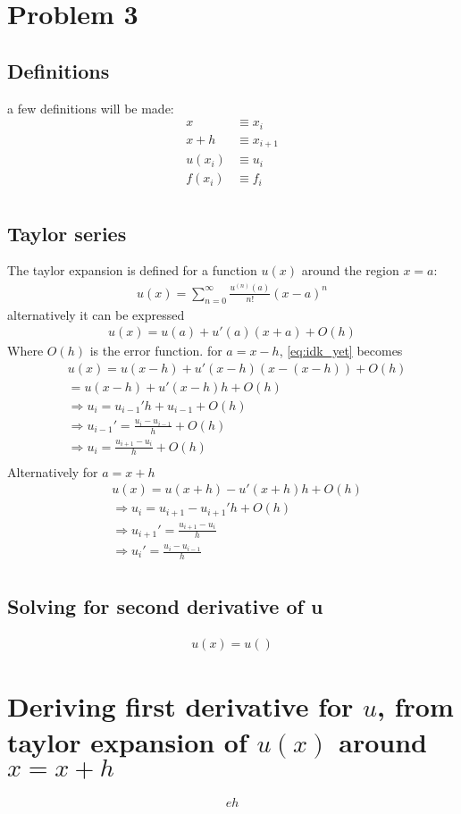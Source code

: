 \documentclass{article}
\begin{document}
\section{Problem 3}
\subsection{Definitions}
a few definitions will be made:
\begin{align*}
    x &\equiv x_i\\
    x+h &\equiv x_{i+1}\\
    u(x_i) &\equiv u_i\\
    f(x_i) &\equiv f_i\\
\end{align*}
\subsection{Taylor series}
The taylor expansion is defined for a function $u(x)$ around the region $x=a$:
\begin{align*}
    u(x) = \sum_{n=0}^{\infty} \frac{u^{(n)}(a)}{n!}(x-a)^n
\end{align*}
alternatively it can be expressed
\begin{align}
    \label{eq:idk_yet}
    u(x) = u(a) + u'(a)(x+a) + O(h)
\end{align}
Where $O(h)$ is the error function.
for $a=x-h$, \ref{eq:idk_yet} becomes
\begin{align*}
    &u(x) = u(x-h) + u'(x-h)(x - (x-h)) + O(h)\\
    &= u(x-h) + u'(x-h)h + O(h)\\
    &\Rightarrow u_i =  u_{i-1}'h +u_{i-1} + O(h)\\
    &\Rightarrow  u_{i-1}' = \frac{u_i - u_{i-1}}{h} + O(h)\\
    &\Rightarrow u_i=  \frac{u_{i+1} - u_{i}}{h} + O(h)\\
\end{align*}
Alternatively for $a = x+h$
\begin{align*}
    &u(x) = u(x+h) - u'(x+h)h + O(h)\\
    &\Rightarrow u_i = u_{i+1} - u_{i+1}'h + O(h)\\
    &\Rightarrow u_{i+1}' =\frac{u_{i+1} - u_{i}}{h}\\
    &\Rightarrow u_{i}' =\frac{u_{i} - u_{i-1}}{h}\\
\end{align*}
\subsection{Solving for second derivative of u}
\begin{align}
    \label{eq:idk_nr_2}
    u(x) = u()
\end{align}



\appendix

\section{Deriving first derivative for $u$, from taylor expansion of $u(x)$ around $x=x+h$}




\begin{align*}
   eh 
\end{align*}
\end{document}
